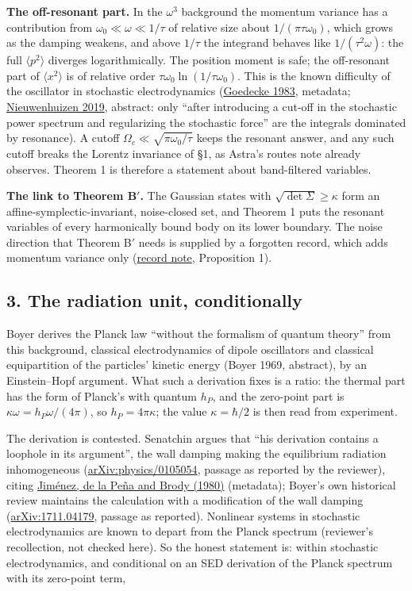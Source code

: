 \documentclass[11pt,a4paper]{article}
\begin{document}
\textbf{The off-resonant part.} In the \(\omega^3\) background the
momentum variance has a contribution from \(\omega_0\ll\omega\ll1/\tau\)
of relative size about \(1/(\pi\tau\omega_0)\), which grows as the
damping weakens, and above \(1/\tau\) the integrand behaves like
\(1/(\tau^2\omega)\): the full \(\langle p^2\rangle\) diverges
logarithmically. The position moment is safe; the off-resonant part of
\(\langle x^2\rangle\) is of relative order
\(\tau\omega_0\ln(1/\tau\omega_0)\). This is the known difficulty of the
oscillator in stochastic electrodynamics
(\href{https://doi.org/10.1007/BF00728140}{Goedecke 1983}, metadata;
\href{https://doi.org/10.3390/atoms7020059}{Nieuwenhuizen 2019},
abstract: only ``after introducing a cut-off in the stochastic power
spectrum and regularizing the stochastic force'' are the integrals
dominated by resonance). A cutoff \(\Omega_c\ll\sqrt{\pi\omega_0/\tau}\)
keeps the resonant answer, and any such cutoff breaks the Lorentz
invariance of §1, as Astra's routes note already observes. Theorem 1 is
therefore a statement about band-filtered variables.

\textbf{The link to Theorem B\('\).} The Gaussian states with
\(\sqrt{\det\Sigma}\ge\kappa\) form an affine-symplectic-invariant,
noise-closed set, and Theorem 1 puts the resonant variables of every
harmonically bound body on its lower boundary. The noise direction that
Theorem B\('\) needs is supplied by a forgotten record, which adds
momentum variance only (\href{newton-record-parallel-move.md}{record
note}, Proposition 1).

\hypertarget{the-radiation-unit-conditionally}{%
\subsection{3. The radiation unit,
conditionally}\label{the-radiation-unit-conditionally}}

Boyer derives the Planck law ``without the formalism of quantum theory''
from this background, classical electrodynamics of dipole oscillators
and classical equipartition of the particles' kinetic energy (Boyer
1969, abstract), by an Einstein--Hopf argument. What such a derivation
fixes is a ratio: the thermal part has the form of Planck's with quantum
\(h_P\), and the zero-point part is \(\kappa\omega=h_P\omega/(4\pi)\),
so \(h_P=4\pi\kappa\); the value \(\kappa=\hbar/2\) is then read from
experiment.

The derivation is contested. Senatchin argues that ``his derivation
contains a loophole in its argument'', the wall damping making the
equilibrium radiation inhomogeneous
(\href{https://arxiv.org/abs/physics/0105054}{arXiv:physics/0105054},
passage as reported by the reviewer), citing
\href{https://doi.org/10.1119/1.12221}{Jiménez, de la Peña and Brody
(1980)} (metadata); Boyer's own historical review maintains the
calculation with a modification of the wall damping
(\href{https://arxiv.org/abs/1711.04179}{arXiv:1711.04179}, passage as
reported). Nonlinear systems in stochastic electrodynamics are known to
depart from the Planck spectrum (reviewer's recollection, not checked
here). So the honest statement is: within stochastic electrodynamics,
and conditional on an SED derivation of the Planck spectrum with its
zero-point term,
\end{document}
